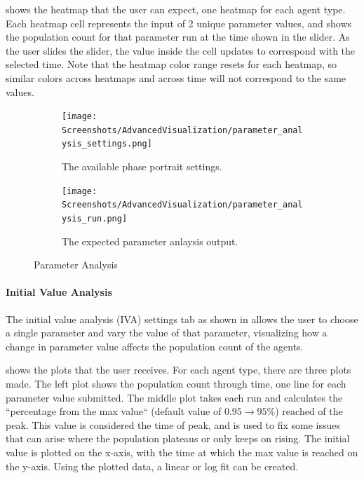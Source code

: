  shows the heatmap that the user can expect, one heatmap for each agent type.
Each heatmap cell represents the input of 2 unique parameter values, and shows the population count for that parameter run at the time shown in the slider. 
As the user slides the slider, the value inside the cell updates to correspond with the selected time. 
Note that the heatmap color range resets for each heatmap, so similar colors across heatmaps and across time will not correspond to the same values.

\begin{figure}[h!]
    \centering
    \begin{subfigure}{0.49\linewidth}
        \centering
        \captionsetup{width=1\linewidth}
        \texttt{[image: Screenshots/AdvancedVisualization/parameter\_analysis\_settings.png]}
        \caption{
            The available phase portrait settings. 
        }
        \label{fig:ss:av:parameter_analysis_settings}
    \end{subfigure}
    \hfill
    \begin{subfigure}{0.49\linewidth}
        \centering
        \captionsetup{width=1\linewidth}
        \texttt{[image: Screenshots/AdvancedVisualization/parameter\_analysis\_run.png]}
        \caption{
            The expected parameter anlaysis output. 
        }
        \label{fig:ss:av:parameter_analysis_run}
    \end{subfigure}
    \caption{Parameter Analysis}
\end{figure}


\paragraph{Initial Value Analysis}
\label{sec:initial_value_analysis}
The initial value analysis (IVA) settings tab as shown in  allows the user to choose a single parameter and vary the value of that parameter, visualizing how a change in parameter value affects the population count of the agents.

 shows the plots that the user receives.
For each agent type, there are three plots made.
The left plot shows the population count through time, one line for each parameter value submitted.
The middle plot takes each run and calculates the “percentage from the max value“ (default value of $0.95 \rightarrow 95\%$) reached of the peak.
This value is considered the time of peak, and is used to fix some issues that can arise where the population plateaus or only keeps on rising.
The initial value is plotted on the x-axis, with the time at which the max value is reached on the y-axis.
Using the plotted data, a linear or log fit can be created.


